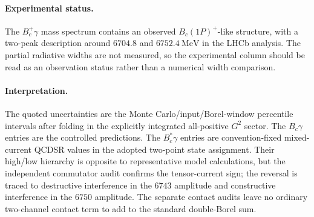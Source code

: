 \documentclass[11pt]{article}
\begin{document}
\paragraph{Experimental status.}
The \(B_c^+\gamma\) mass spectrum contains an observed \(B_c(1P)^+\)-like
structure, with a two-peak description around \(6704.8\) and
\(6752.4~\mathrm{MeV}\) in the LHCb analysis.  The partial radiative widths are
not measured, so the experimental column should be read as an observation
status rather than a numerical width comparison.

\paragraph{Interpretation.}
The quoted uncertainties are the Monte Carlo/input/Borel-window percentile
intervals after folding in the explicitly integrated all-positive \(G^2\)
sector.  The \(B_c\gamma\) entries are the controlled predictions.  The
\(B_c^\ast\gamma\) entries are convention-fixed mixed-current QCDSR values in
the adopted two-point state assignment.  Their high/low hierarchy is opposite
to representative model calculations, but the independent commutator audit
confirms the tensor-current sign; the reversal is traced to destructive
interference in the \(6743\) amplitude and constructive interference in the
\(6750\) amplitude.  The separate contact audits leave no ordinary two-channel
contact term to add to the standard double-Borel sum.
\end{document}
